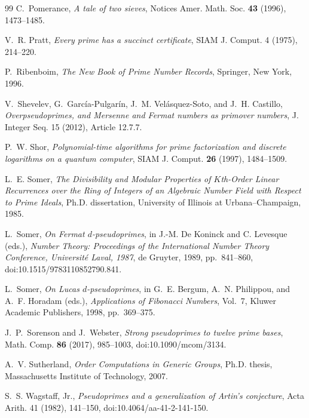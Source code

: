 \documentclass[11pt]{article}
\begin{document}
\begin{thebibliography}{99}
C.~Pomerance,
\emph{A tale of two sieves},
Notices Amer. Math. Soc. \textbf{43} (1996), 1473--1485.

V.~R. Pratt,
\emph{Every prime has a succinct certificate},
SIAM J. Comput. 4 (1975), 214--220.

P.~Ribenboim,
\emph{The New Book of Prime Number Records},
Springer, New York, 1996.

V.~Shevelev, G.~Garc\'ia-Pulgar\'in, J.~M. Vel\'asquez-Soto, and
J.~H. Castillo,
\emph{Overpseudoprimes, and Mersenne and Fermat numbers as primover numbers},
J. Integer Seq. 15 (2012), Article 12.7.7.

P.~W. Shor,
\emph{Polynomial-time algorithms for prime factorization and discrete
logarithms on a quantum computer},
SIAM J. Comput. \textbf{26} (1997), 1484--1509.

L.~E. Somer,
\emph{The Divisibility and Modular Properties of $K$th-Order Linear
Recurrences over the Ring of Integers of an Algebraic Number Field with
Respect to Prime Ideals},
Ph.D. dissertation, University of Illinois at Urbana--Champaign, 1985.

L.~Somer,
\emph{On Fermat $d$-pseudoprimes},
in J.-M. De Koninck and C. Levesque (eds.),
\emph{Number Theory: Proceedings of the International Number Theory
Conference, Universit\'e Laval, 1987},
de Gruyter, 1989, pp.~841--860,
doi:10.1515/9783110852790.841.

L.~Somer,
\emph{On Lucas $d$-pseudoprimes},
in G.~E. Bergum, A.~N. Philippou, and A.~F. Horadam (eds.),
\emph{Applications of Fibonacci Numbers}, Vol.~7,
Kluwer Academic Publishers, 1998, pp.~369--375.

J.~P.~Sorenson and J.~Webster,
\emph{Strong pseudoprimes to twelve prime bases},
Math. Comp. \textbf{86} (2017), 985--1003,
doi:10.1090/mcom/3134.

A.~V. Sutherland,
\emph{Order Computations in Generic Groups},
Ph.D. thesis, Massachusetts Institute of Technology, 2007.

S.~S. Wagstaff, Jr.,
\emph{Pseudoprimes and a generalization of Artin's conjecture},
Acta Arith. 41 (1982), 141--150,
doi:10.4064/aa-41-2-141-150.

\end{thebibliography}
\end{document}
